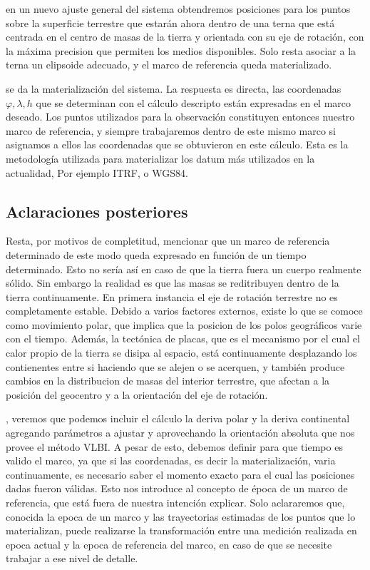 \documentclass{tufte-book}
\begin{document}
 en un nuevo ajuste general del sistema
obtendremos posiciones para los puntos sobre la superficie terrestre que estarán
ahora dentro de una terna que está centrada en el centro de masas de la tierra y
orientada con su eje de rotación, con la máxima precision que permiten los medios
disponibles. Solo resta asociar a la terna un elipsoide adecuado, y el marco de
referencia queda materializado.

 se da la materialización del sistema.
La respuesta es directa, las coordenadas \(\varphi,\lambda,h\) que se determinan con
el cálculo descripto están expresadas en el marco deseado. Los puntos utilizados para
la observación constituyen entonces nuestro marco de referencia, y siempre trabajaremos
dentro de este mismo marco si asignamos a ellos las coordenadas que se obtuvieron en
este cálculo. Esta es la metodología utilizada para materializar los datum más utilizados
en la actualidad, Por ejemplo ITRF, o WGS84.

\subsection{Aclaraciones posteriores}

Resta, por motivos de completitud, mencionar que un marco de referencia determinado
de este modo queda expresado en función de un tiempo determinado. Esto no sería así
en caso de que la tierra fuera un cuerpo realmente sólido. Sin embargo la realidad
es que las masas se reditribuyen dentro de la tierra continuamente. En primera
instancia el eje de rotación terrestre no es completamente estable. Debido a varios
factores externos, existe lo que se comoce como movimiento polar, que implica que
la posicion de los polos geográficos varie con el tiempo. Además, la tectónica de
placas, que es el mecanismo por el cual el calor propio de la tierra se disipa
al espacio, está continuamente desplazando los contienentes entre si haciendo que
se alejen o se acerquen, y también produce cambios en la distribucion de masas
del interior terrestre, que afectan a la posición del geocentro y a la orientación
del eje de rotación.

, veremos
que podemos incluir el cálculo la deriva polar y la deriva continental agregando
parámetros a ajustar y aprovechando la orientación absoluta que nos provee el
método VLBI. A pesar de esto, debemos definir para que tiempo es valido el marco,
ya que si las coordenadas, es decir la materialización, varia continuamente, es
necesario saber el momento exacto para el cual las posiciones dadas fueron válidas.
Esto nos introduce al concepto de época de un marco de referencia, que está fuera
de nuestra intención explicar. Solo aclararemos que, conocida la epoca de un marco
y las trayectorias estimadas de los puntos que lo materializan, puede realizarse
la transformación entre una medición realizada en epoca actual y la epoca de referencia
del marco, en caso de que se necesite trabajar a ese nivel de detalle.
\end{document}
